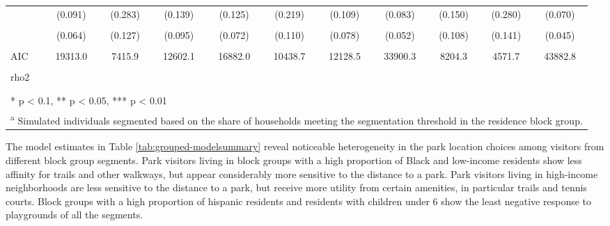 \documentclass[3p, authoryear, review]{elsarticle} %
\begin{document}
\begin{landscape}
\begin{table}
{\begin{tabular}[t]{lcccccccccc}
 & (0.091) & (0.283) & (0.139) & (0.125) & (0.219) & (0.109) & (0.083) & (0.150) & (0.280) & (0.070)\\
\cellcolor{gray!6}{Other Sport} & \cellcolor{gray!6}{-0.121*} & \cellcolor{gray!6}{-0.286**} & \cellcolor{gray!6}{-0.430***} & \cellcolor{gray!6}{-0.304***} & \cellcolor{gray!6}{-0.594***} & \cellcolor{gray!6}{-0.086} & \cellcolor{gray!6}{-0.242***} & \cellcolor{gray!6}{-0.116} & \cellcolor{gray!6}{-0.409***} & \cellcolor{gray!6}{-0.243***}\\
 & (0.064) & (0.127) & (0.095) & (0.072) & (0.110) & (0.078) & (0.052) & (0.108) & (0.141) & (0.045)\\
\midrule
\cellcolor{gray!6}{Num.Obs.} & \cellcolor{gray!6}{6589} & \cellcolor{gray!6}{2546} & \cellcolor{gray!6}{3939} & \cellcolor{gray!6}{6926} & \cellcolor{gray!6}{3478} & \cellcolor{gray!6}{4839} & \cellcolor{gray!6}{11683} & \cellcolor{gray!6}{2703} & \cellcolor{gray!6}{1751} & \cellcolor{gray!6}{15546}\\
AIC & 19313.0 & 7415.9 & 12602.1 & 16882.0 & 10438.7 & 12128.5 & 33900.3 & 8204.3 & 4571.7 & 43882.8\\
\cellcolor{gray!6}{Log.Lik.} & \cellcolor{gray!6}{-9646.504} & \cellcolor{gray!6}{-3697.931} & \cellcolor{gray!6}{-6291.073} & \cellcolor{gray!6}{-8430.977} & \cellcolor{gray!6}{-5209.344} & \cellcolor{gray!6}{-6054.235} & \cellcolor{gray!6}{-16940.163} & \cellcolor{gray!6}{-4092.145} & \cellcolor{gray!6}{-2275.831} & \cellcolor{gray!6}{-21931.392}\\
rho2 &  &  &  &  &  &  &  &  &  & \\
\cellcolor{gray!6}{rho20} & \cellcolor{gray!6}{0.389} & \cellcolor{gray!6}{0.394} & \cellcolor{gray!6}{0.334} & \cellcolor{gray!6}{0.492} & \cellcolor{gray!6}{0.375} & \cellcolor{gray!6}{0.478} & \cellcolor{gray!6}{0.395} & \cellcolor{gray!6}{0.369} & \cellcolor{gray!6}{0.458} & \cellcolor{gray!6}{0.412}\\
\bottomrule
\multicolumn{11}{l}{\textsuperscript{} * p < 0.1, ** p < 0.05, *** p < 0.01}\\
\multicolumn{11}{l}{\textsuperscript{a} Simulated individuals segmented based on the share of households meeting the segmentation threshold in the residence block group.}\\
\end{tabular}}
\end{table}
\end{landscape}

The model estimates in Table \ref{tab:grouped-modelsummary} reveal noticeable
heterogeneity in the park location choices among visitors from different
block group segments. Park
visitors living in block groups with a high proportion of Black and low-income
residents show less affinity for trails and other walkways, but appear
considerably more sensitive to the distance to a park. Park visitors living in
high-income neighborhoods are less sensitive to the distance to a park, but
receive more utility from certain amenities, in particular trails and tennis
courts. Block groups with a high proportion of hispanic residents and residents
with children under 6 show the least negative response to playgrounds of
all the segments.
\end{document}
